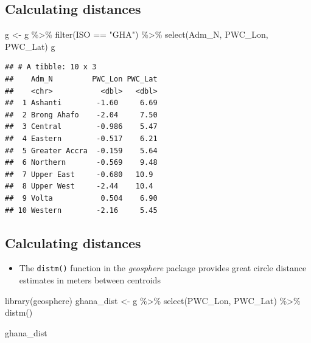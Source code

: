 \documentclass[
]{book}
\newenvironment{Shaded}{\begin{snugshade}}{\end{snugshade}}
\newcommand{\FunctionTok}[1]{\textcolor[rgb]{0.00,0.00,0.00}{#1}}
\newcommand{\NormalTok}[1]{#1}
\newcommand{\OtherTok}[1]{\textcolor[rgb]{0.56,0.35,0.01}{#1}}
\newcommand{\SpecialCharTok}[1]{\textcolor[rgb]{0.00,0.00,0.00}{#1}}
\newcommand{\StringTok}[1]{\textcolor[rgb]{0.31,0.60,0.02}{#1}}
\providecommand{\tightlist}{%
  \setlength{\itemsep}{0pt}\setlength{\parskip}{0pt}}
\begin{document}
\hypertarget{calculating-distances-1}{%
\subsection{Calculating distances}\label{calculating-distances-1}}

\begin{Shaded}
\begin{Highlighting}[]
\NormalTok{g }\OtherTok{\textless{}{-}}\NormalTok{ g }\SpecialCharTok{\%\textgreater{}\%}
  \FunctionTok{filter}\NormalTok{(ISO }\SpecialCharTok{==} \StringTok{"GHA"}\NormalTok{) }\SpecialCharTok{\%\textgreater{}\%}
  \FunctionTok{select}\NormalTok{(Adm\_N, PWC\_Lon, PWC\_Lat)}
\NormalTok{g}
\end{Highlighting}
\end{Shaded}

\begin{verbatim}
## # A tibble: 10 x 3
##    Adm_N         PWC_Lon PWC_Lat
##    <chr>           <dbl>   <dbl>
##  1 Ashanti        -1.60     6.69
##  2 Brong Ahafo    -2.04     7.50
##  3 Central        -0.986    5.47
##  4 Eastern        -0.517    6.21
##  5 Greater Accra  -0.159    5.64
##  6 Northern       -0.569    9.48
##  7 Upper East     -0.680   10.9 
##  8 Upper West     -2.44    10.4 
##  9 Volta           0.504    6.90
## 10 Western        -2.16     5.45
\end{verbatim}

\hypertarget{calculating-distances-2}{%
\subsection{Calculating distances}\label{calculating-distances-2}}

\begin{itemize}
\tightlist
\item
  The \texttt{distm()} function in the \emph{geosphere} package provides great circle distance estimates in meters between centroids
\end{itemize}

\begin{Shaded}
\begin{Highlighting}[]
\FunctionTok{library}\NormalTok{(geosphere)}
\NormalTok{ghana\_dist }\OtherTok{\textless{}{-}}\NormalTok{ g }\SpecialCharTok{\%\textgreater{}\%}
  \FunctionTok{select}\NormalTok{(PWC\_Lon, PWC\_Lat) }\SpecialCharTok{\%\textgreater{}\%}
  \FunctionTok{distm}\NormalTok{()}

\NormalTok{ghana\_dist}
\end{Highlighting}
\end{Shaded}
\end{document}
